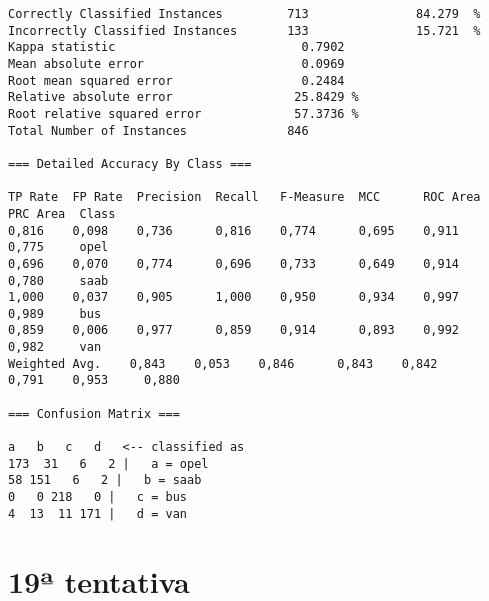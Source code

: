 \documentclass[
	article,			%
	11pt,				%
	oneside,			%
	a4paper,			%
	english,			%
	brazil,				%
	sumario=tradicional
	]{abntex2}
\begin{document}
\begin{lstlisting}
Correctly Classified Instances         713               84.279  %
Incorrectly Classified Instances       133               15.721  %
Kappa statistic                          0.7902
Mean absolute error                      0.0969
Root mean squared error                  0.2484
Relative absolute error                 25.8429 %
Root relative squared error             57.3736 %
Total Number of Instances              846     

=== Detailed Accuracy By Class ===

TP Rate  FP Rate  Precision  Recall   F-Measure  MCC      ROC Area  PRC Area  Class
0,816    0,098    0,736      0,816    0,774      0,695    0,911     0,775     opel
0,696    0,070    0,774      0,696    0,733      0,649    0,914     0,780     saab
1,000    0,037    0,905      1,000    0,950      0,934    0,997     0,989     bus
0,859    0,006    0,977      0,859    0,914      0,893    0,992     0,982     van
Weighted Avg.    0,843    0,053    0,846      0,843    0,842      0,791    0,953     0,880     

=== Confusion Matrix ===

a   b   c   d   <-- classified as
173  31   6   2 |   a = opel
58 151   6   2 |   b = saab
0   0 218   0 |   c = bus
4  13  11 171 |   d = van

\end{lstlisting}

\newpage

\section{19ª tentativa}
\end{document}

